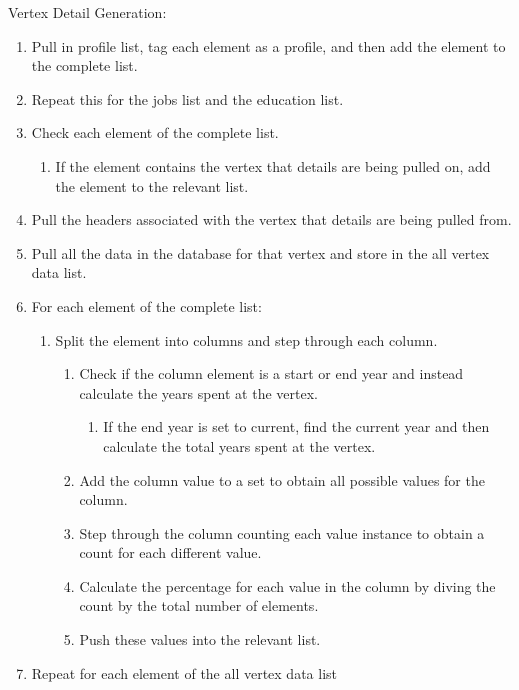 \begin{description}
    \item[Vertex Detail Generation:]
\end{description}
\begin{enumerate}
  \item Pull in profile list, tag each element as a profile, and then add
  the element to the complete list.
  \item Repeat this for the jobs list and the education list.
  \item Check each element of the complete list.
  \begin{enumerate}
    \item If the element contains the vertex that details are being pulled on, add
    the element to the relevant list.
  \end{enumerate}
  \item Pull the headers associated with the vertex that details are being pulled
  from.
  \item Pull all the data in the database for that vertex and store in the all
  vertex data list.
  \item For each element of the complete list:
  \begin{enumerate}
    \item Split the element into columns and step through each column.
    \begin{enumerate}
    	\item Check if the column element is a start or end year and instead
    	calculate the years spent at the vertex.
    	\begin{enumerate}
    	  \item If the end year is set to current, find the current year and then
    	  calculate the total years spent at the vertex.
    	\end{enumerate}
    	\item Add the column value to a set to obtain all possible values for
    	the column.
    	\item Step through the column counting each value instance to obtain a
    	count for each different value.
    	\item Calculate the percentage for each value in the column by diving the
    	count by the total number of elements.
    	\item Push these values into the relevant list.
    \end{enumerate} 
  \end{enumerate}
  \item Repeat for each element of the all vertex data list

\end{enumerate}
